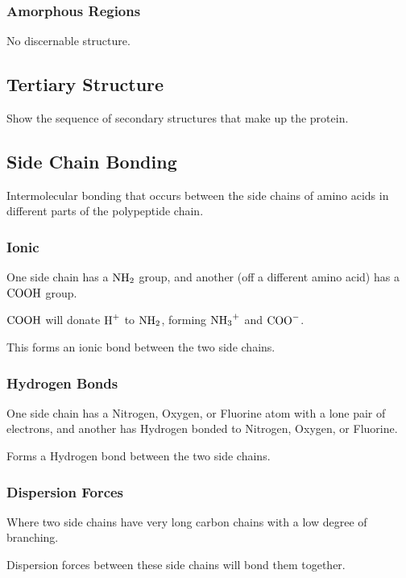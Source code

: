 \documentclass[a4paper,11pt]{article}
\begin{document}
\subsubsection{Amorphous Regions}

No discernable structure.


\subsection{Tertiary Structure}

Show the sequence of secondary structures that make up the protein.


\subsection{Side Chain Bonding}

Intermolecular bonding that occurs between the side chains of amino acids in
different parts of the polypeptide chain.


\subsubsection{Ionic}

One side chain has a $\ce{NH2}$ group, and another (off a different amino acid)
has a $\ce{COOH}$ group.

$\ce{COOH}$ will donate $\ce{H+}$ to $\ce{NH2}$, forming $\ce{NH3+}$ and
$\ce{COO-}$.

This forms an ionic bond between the two side chains.


\subsubsection{Hydrogen Bonds}

One side chain has a Nitrogen, Oxygen, or Fluorine atom with a lone pair of
electrons, and another has Hydrogen bonded to Nitrogen, Oxygen, or Fluorine.

Forms a Hydrogen bond between the two side chains.


\subsubsection{Dispersion Forces}

Where two side chains have very long carbon chains with a low degree of
branching.

Dispersion forces between these side chains will bond them together.
\end{document}
